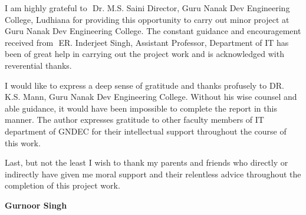 \begin{Large}
\end{Large}
\vskip 0.1in I am  highly grateful to ​
Dr. M.S. Saini Director, Guru Nanak Dev Engineering  
College, Ludhiana for providing this opportunity to carry out minor project at Guru Nanak  
Dev Engineering College. The constant guidance and encouragement received from ​
ER. Inderjeet Singh, Assistant Professor, Department of IT has been of great help in carrying out the project work and is acknowledged with reverential thanks.

I would like to express a deep sense of gratitude and thanks profusely to DR. K.S. Mann, Guru Nanak Dev Engineering College. Without his wise counsel and able guidance, it would have been impossible to complete the report in this manner. The author expresses gratitude to other faculty members of IT department of GNDEC for their intellectual support throughout the course of this work.

Last, but not the least I wish to thank my parents and friends who directly or indirectly have given me moral support and their relentless advice throughout the completion of this project work. 

\vskip 0.4in
\noindent \textbf{Gurnoor Singh}

